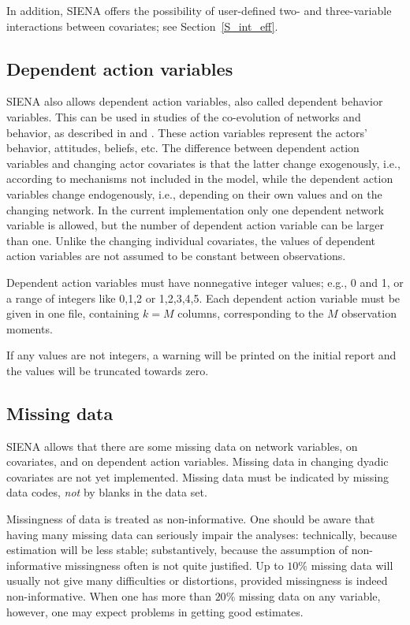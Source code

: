 \documentclass[a4paper,fleqn]{article}
\newcommand{\+}{\, + \,}
\newcommand{\SI}{{\sf SIENA }}
\begin{document}
{In addition, \SI offers the possibility of user-defined two- and three-variable
interactions between covariates; see Section~\ref{S_int_eff}.


\subsection{Dependent action variables}
\label{S_depaction}

\SI also allows dependent action variables,
also called dependent behavior variables. This can be used in studies
of the co-evolution of networks and behavior, as described
in \citet*{SnijdersEA07} and \citet*{SteglichEA10}.
These action variables represent the actors' behavior, attitudes, beliefs, etc.
The difference between dependent action variables and changing actor
covariates is that the latter change exogenously, i.e., according
to mechanisms not included in the model, while the dependent
action variables change endogenously, i.e.,
depending on their own values and on the changing network.
In the current implementation only one dependent network variable is
allowed, but the number of dependent action variable can be larger than one.
Unlike the changing individual covariates,
the values of dependent action variables are not assumed to be
constant between observations.

Dependent action variables must have nonnegative integer values;
e.g., 0 and 1, or a range of integers like 0,1,2 or 1,2,3,4,5.
Each dependent action variable must be given in one
file, containing $k = M$ columns, corresponding to the $M$
observation moments.

If any values are not integers, a warning will be printed on the initial report
and the values will be truncated towards zero.


\begin{screen}
\newpage
\end{screen}
\subsection{Missing data}

\SI allows that there are some missing data on network variables,
on covariates, and on dependent action
variables. Missing data in changing dyadic covariates are not yet
implemented. Missing data must be indicated by missing data codes,
{\em not} by blanks in the data set.

Missingness of data is treated as non-informative.
One should be aware that having many missing data can seriously
impair the analyses: technically, because estimation will be
less stable; substantively, because the assumption of
non-informative missingness often is not quite justified.
Up to $10\%$ missing data will usually not give many difficulties
or distortions, provided missingness is indeed non-informative.
When one has more than $20\%$ missing data on any variable, however,
one may expect problems in getting good estimates.

}
\end{document}
